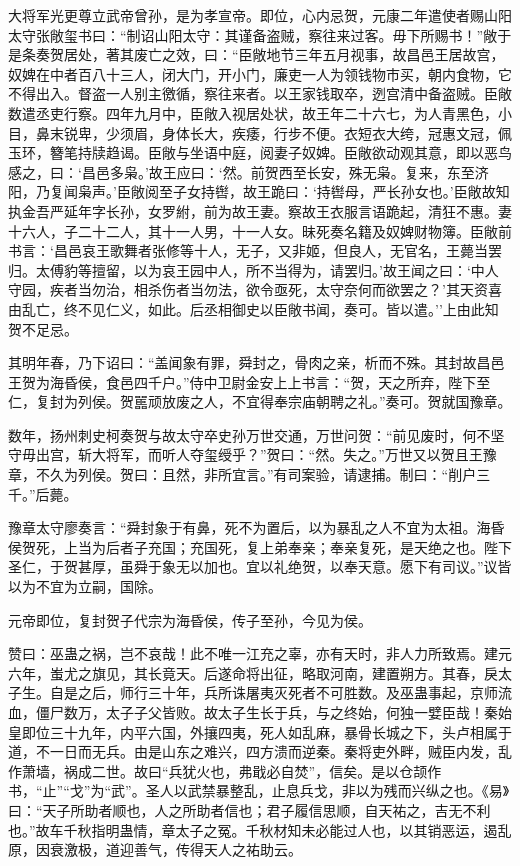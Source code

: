 \documentclass[]{article}
\begin{document}
大将军光更尊立武帝曾孙，是为孝宣帝。即位，心内忌贺，元康二年遣使者赐山阳太守张敞玺书曰：``制诏山阳太守：其谨备盗贼，察往来过客。毋下所赐书！''敞于是条奏贺居处，著其废亡之效，曰：``臣敞地节三年五月视事，故昌邑王居故宫，奴婢在中者百八十三人，闭大门，开小门，廉吏一人为领钱物市买，朝内食物，它不得出入。督盗一人别主徼循，察往来者。以王家钱取卒，迾宫清中备盗贼。臣敞数遣丞吏行察。四年九月中，臣敞入视居处状，故王年二十六七，为人青黑色，小目，鼻末锐卑，少须眉，身体长大，疾痿，行步不便。衣短衣大绔，冠惠文冠，佩玉环，簪笔持牍趋谒。臣敞与坐语中庭，阅妻子奴婢。臣敞欲动观其意，即以恶鸟感之，曰：`昌邑多枭。'故王应曰：`然。前贺西至长安，殊无枭。复来，东至济阳，乃复闻枭声。'臣敞阅至子女持辔，故王跪曰：`持辔母，严长孙女也。'臣敞故知执金吾严延年字长孙，女罗紨，前为故王妻。察故王衣服言语跪起，清狂不惠。妻十六人，子二十二人，其十一人男，十一人女。昧死奏名籍及奴婢财物簿。臣敞前书言：`昌邑哀王歌舞者张修等十人，无子，又非姬，但良人，无官名，王薨当罢归。太傅豹等擅留，以为哀王园中人，所不当得为，请罢归。'故王闻之曰：`中人守园，疾者当勿治，相杀伤者当勿法，欲令亟死，太守奈何而欲罢之？'其天资喜由乱亡，终不见仁义，如此。后丞相御史以臣敞书闻，奏可。皆以遣。''上由此知贺不足忌。

其明年春，乃下诏曰：``盖闻象有罪，舜封之，骨肉之亲，析而不殊。其封故昌邑王贺为海昏侯，食邑四千户。''侍中卫尉金安上上书言：``贺，天之所弃，陛下至仁，复封为列侯。贺嚚顽放废之人，不宜得奉宗庙朝聘之礼。''奏可。贺就国豫章。

数年，扬州刺史柯奏贺与故太守卒史孙万世交通，万世问贺：``前见废时，何不坚守毋出宫，斩大将军，而听人夺玺绶乎？''贺曰：``然。失之。''万世又以贺且王豫章，不久为列侯。贺曰：且然，非所宜言。''有司案验，请逮捕。制曰：``削户三千。''后薨。

豫章太守廖奏言：``舜封象于有鼻，死不为置后，以为暴乱之人不宜为太祖。海昏侯贺死，上当为后者子充国；充国死，复上弟奉亲；奉亲复死，是天绝之也。陛下圣仁，于贺甚厚，虽舜于象无以加也。宜以礼绝贺，以奉天意。愿下有司议。''议皆以为不宜为立嗣，国除。

元帝即位，复封贺子代宗为海昏侯，传子至孙，今见为侯。

赞曰：巫蛊之祸，岂不哀哉！此不唯一江充之辜，亦有天时，非人力所致焉。建元六年，蚩尤之旗见，其长竟天。后遂命将出征，略取河南，建置朔方。其春，戾太子生。自是之后，师行三十年，兵所诛屠夷灭死者不可胜数。及巫蛊事起，京师流血，僵尸数万，太子子父皆败。故太子生长于兵，与之终始，何独一嬖臣哉！秦始皇即位三十九年，内平六国，外攘四夷，死人如乱麻，暴骨长城之下，头卢相属于道，不一日而无兵。由是山东之难兴，四方溃而逆秦。秦将吏外畔，贼臣内发，乱作萧墙，祸成二世。故曰``兵犹火也，弗戢必自焚''，信矣。是以仓颉作书，``止''``戈''为``武''。圣人以武禁暴整乱，止息兵戈，非以为残而兴纵之也。《易》曰：``天子所助者顺也，人之所助者信也；君子履信思顺，自天祐之，吉无不利也。''故车千秋指明蛊情，章太子之冤。千秋材知未必能过人也，以其销恶运，遏乱原，因衰激极，道迎善气，传得天人之祐助云。
\end{document}
